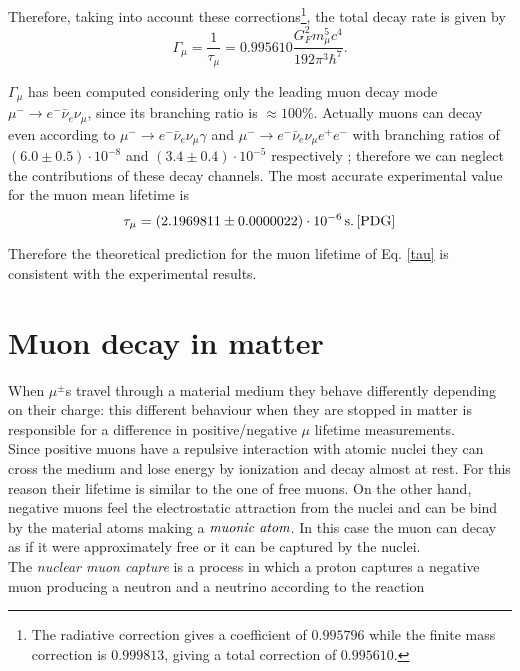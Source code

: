 Therefore, taking into account these corrections\footnote{The radiative correction gives a coefficient of $0.995796$ while the finite mass correction is $0.999813$, giving a total correction of $0.995610$.}, the total decay rate is given by \cite{Measday}
\begin{equation}
\Gamma_{\mu} = \frac{1}{\tau_{\mu}}=  0.995610 \frac{ G_{F}^2 m_{\mu}^5 c^4}{192 \pi^3 \hbar^7} .   
\end{equation}

$\Gamma_{\mu}$ has been computed considering only the leading muon decay mode $\mu^- \rightarrow e^- \bar \nu_{e} \nu_{\mu}$, since its branching ratio is $\approx 100 \%$. Actually muons can decay even according to $\mu^- \rightarrow e^-  \bar \nu_{e}  \nu_{\mu} \gamma$
and $\mu^- \rightarrow e^-  \bar \nu_{e}  \nu_{\mu} e^+ e^-$ with branching ratios of $(6.0 \pm 0.5) \cdot 10^{-8}$ and $(3.4 \pm 0.4) \cdot 10^{-5}$ respectively \cite{PDG}; therefore we can neglect the contributions of these decay channels. 
The most accurate experimental value for the muon mean lifetime is 
\begin{equation}
\tau_{\mu} = (2.1969811 \pm 0.0000022) \cdot 10^{-6} \, \si{s} .  \, \cite{PDG}
\end{equation}

Therefore the theoretical prediction for the muon lifetime of Eq. \eqref{tau} is consistent with the experimental results.

\section{Muon decay in matter}

When $\mu^{\pm}$s travel through a material medium they behave differently depending on their charge:
this different behaviour when they are stopped in matter is responsible for a difference in positive/negative $\mu$ lifetime measurements.\\ 
Since positive muons have a repulsive interaction with atomic nuclei they can cross the medium and lose energy by ionization and decay almost at rest. For this reason their lifetime is similar to the one of free muons.  On the other hand, negative muons feel the electrostatic attraction from the nuclei and can be bind by the material atoms making a $\emph{muonic atom}$. In this
case the muon can decay as if it were approximately free or it can be captured by the nuclei.\\ 
The \emph{nuclear muon capture} is a process in which a proton captures a negative muon producing a neutron and a neutrino according to the reaction

